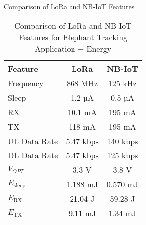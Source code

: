 \begin{table}[ht!]
    \centering
    \caption{Comparison of LoRa and NB-IoT Features}
    \begin{tabular}{l c c}
    \toprule
    Feature & LoRa & NB-IoT \\
    \midrule
    Frequency & 868 MHz & 125 kHz \\
    Sleep & 1.2 µA & 0.5 µA \\
    RX & 10.1 mA & 195 mA \\
    TX & 118 mA & 195 mA \\
    UL Data Rate & 5.47 kbps & 140 kbps \\
    DL Data Rate & 5.47 kbps & 125 kbps \\
    $V_{OPT}$ & 3.3 V & 3.8 V \\
    $E_{\text{sleep}}$ & 1.188 mJ & 0.570 mJ \\
    $E_{\text{RX}}$ & 21.04 J & 59.28 J \\
    $E_{\text{TX}}$ & 9.11 mJ & 1.34 mJ \\
    \bottomrule
    \end{tabular}
    \caption{Comparison of LoRa and NB-IoT Features for Elephant Tracking Application $-$ Energy}
    \label{tab:comparison}
\end{table}